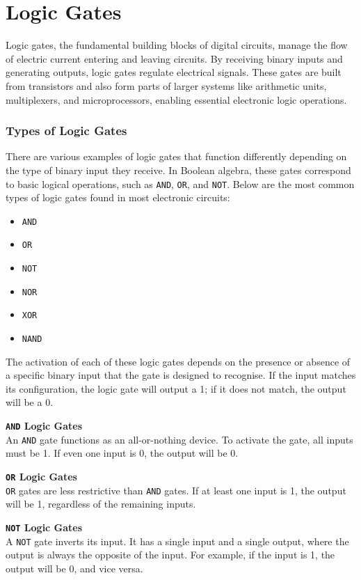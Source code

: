 \section{Logic Gates}
Logic gates, the fundamental building blocks of digital circuits, manage the flow of electric current entering and leaving circuits. By receiving binary inputs and generating outputs, logic gates regulate electrical signals. These gates are built from transistors and also form parts of larger systems like arithmetic units, multiplexers, and microprocessors, enabling essential electronic logic operations.

\subsubsection*{Types of Logic Gates}
There are various examples of logic gates that function differently depending on the type of binary input they receive. In Boolean algebra, these gates correspond to basic logical operations, such as \texttt{AND}, \texttt{OR}, and \texttt{NOT}. Below are the most common types of logic gates found in most electronic circuits:

\begin{itemize}
    \item \texttt{AND}
    \item \texttt{OR}
    \item \texttt{NOT}
    \item \texttt{NOR}
    \item \texttt{XOR}
    \item \texttt{NAND}    
\end{itemize}

The activation of each of these logic gates depends on the presence or absence of a specific binary input that the gate is designed to recognise. If the input matches its configuration, the logic gate will output a 1; if it does not match, the output will be a 0.

\textbf{\texttt{AND} Logic Gates}\\
An \texttt{AND} gate functions as an all-or-nothing device. To activate the gate, all inputs must be 1. If even one input is 0, the output will be 0.

\textbf{\texttt{OR} Logic Gates}\\
\texttt{OR} gates are less restrictive than \texttt{AND} gates. If at least one input is 1, the output will be 1, regardless of the remaining inputs.

\textbf{\texttt{NOT} Logic Gates}\\
A \texttt{NOT} gate inverts its input. It has a single input and a single output, where the output is always the opposite of the input. For example, if the input is 1, the output will be 0, and vice versa.


